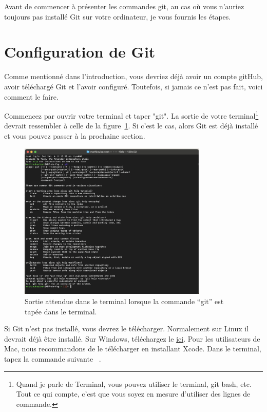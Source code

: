 \documentclass{book}
\newcommand{\code}[1]{\mbox{%
    \ttfamily
    \tcbox[
        on line,
        boxsep=0pt, left=4pt, right=4pt, top=2pt, bottom=1.5pt,
        toprule=0pt, rightrule=0pt, bottomrule=0pt, leftrule=0pt,
        oversize=0pt, enlarge left by=0pt, enlarge right by=0pt,
        colframe=white, colback=black!12,
        height=.8\baselineskip %
    ]{#1}%
}}
\begin{document}
Avant de commencer à présenter les commandes git, au cas où vous n'auriez toujours pas installé Git sur votre ordinateur, je vous fournis les étapes. 

\section{Configuration de Git}

Comme mentionné dans l'introduction, vous devriez déjà avoir un compte gitHub, avoir téléchargé Git et l'avoir configuré. Toutefois, si jamais ce n'est pas fait, voici comment le faire. 

Commencez par ouvrir votre terminal et taper "git". La sortie de votre terminal\footnote{Quand je parle de Terminal, vous pouvez utiliser le terminal, git bash, etc. Tout ce qui compte, c'est que vous soyez en mesure d'utiliser des lignes de commande.} devrait ressembler à celle de la figure~\ref{fig:check_if_git}. Si c'est le cas, alors Git est déjà installé et vous pouvez passer à la prochaine section. 

\begin{figure}[!h]
    \centering
    \includegraphics[width=0.8\textwidth]{images/check_if_git.png}
    \caption{Sortie attendue dans le terminal lorsque la commande ``git'' est tapée dans le terminal.} \label{fig:check_if_git}
\end{figure}

Si Git n'est pas installé, vous devrez le télécharger. Normalement sur Linux il devrait déjà être installé. Sur Windows, téléchargez le \href{https://git-scm.com/}{ici}. Pour les utilisateurs de Mac, nous recommandons de le télécharger en installant Xcode. Dans le terminal, tapez la commande suivante \code{xcode-select --install}.
\end{document}
